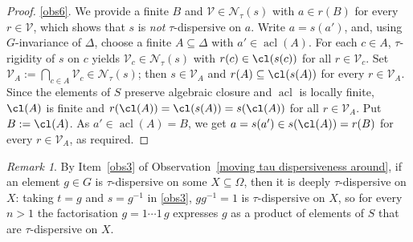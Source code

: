 \documentclass{article}
\theoremstyle{remark}
\newtheorem{remark}[theorem]{Remark}
\theoremstyle{definition}
\DeclareMathOperator{\acl}{acl}
\newcommand{\V}[0]{\mathcal{V}}
\begin{document}
{{{{{\begin{proof}
 \eqref{obs6}. We provide a finite $B$ and $\V \in \mathcal{N}_\tau(s)$ with $a \in r(B)$ for   every $r \in \V$, which shows that $s$ is \emph{not} $\tau$-dispersive on $a$. Write   $a = s(a')$, and, {using $G$-invariance of $\Delta$,} choose a finite $A \subseteq \Delta$ with $a' \in \acl(A)$. For each $c \in A$, $\tau$-rigidity of $s$ on $c$ yields $\V_c \in \mathcal{N}_\tau(s)$ with $r(c) \in \cl(s(c))$ for   all $r \in \V_c$. Set $\V_A := \bigcap_{c \in A} \V_c \in \mathcal{N}_\tau(s)$; then $s \in \V_A$ and $r(A) \subseteq \cl(s(A))$ for every $r \in \V_A$. Since the elements of $S$ {preserve} algebraic closure and $\acl$ is locally finite, $\cl(A)$ is finite and   $r(\cl(A)) = \cl(s(A)) = s(\cl(A))$ for all $r \in \V_A$. Put $B := \cl(A)$. As  $a' \in \acl(A) = B$, we get $a = s(a') \in s(\cl(A)) = r(B)$ for every $r \in \V_A$, as required.

    
  \end{proof}
\begin{remark}\label{rem:deepstuff}
By Item~\eqref{obs3} of Observation~\ref{moving tau dispersiveness around}, if an element $g \in G$   is $\tau$-dispersive on some $X \subseteq \Omega$, then it is deeply $\tau$-dispersive on $X$:  taking $t = g$ and $s = g^{-1}$ in \eqref{obs3}, $gg^{-1} = 1$ is $\tau$-dispersive   on $X$, so for every $n > 1$ the factorisation $g = 1 \cdots 1\, g$ expresses
  $g$ as a product of elements of $S$ that are $\tau$-dispersive on $X$.
\end{remark}

 
 




}}}}}
\end{document}
